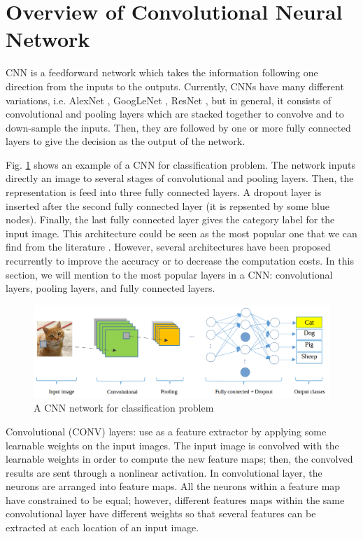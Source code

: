 \documentclass[review]{elsarticle}
\begin{document}
\section{Overview of Convolutional Neural Network}
\label{sOverview}
CNN is a feedforward network which takes the information following one direction from the inputs to the outputs. Currently, CNNs have many different variations, i.e. AlexNet \cite{krizhevsky2012imagenet}, GoogLeNet \cite{szegedy2014going}, ResNet \cite{he2016deep}, but in general, it consists of convolutional and pooling layers which are stacked together to convolve and to down-sample the inputs. Then, they are followed by one or more fully connected layers to give the decision as the output of the network. 

Fig. \ref{imgcnn_network} shows an example of a CNN for classification problem. The network inputs directly an image to several stages of convolutional and pooling layers. Then, the representation is feed into three fully connected layers. A dropout layer is inserted after the second fully connected layer (it is repsented by some blue nodes). Finally, the last fully connected layer gives the category label for the input image. This architecture could be seen as the most popular one that we can find from the literature \cite{lecun1998gradient, krizhevsky2012imagenet}. However, several architectures have been proposed recurrently to improve the accuracy or to decrease the computation costs. In this section, we will mention to the most popular layers in a CNN: convolutional layers, pooling layers, and fully connected layers.

\begin{figure}[!h]
	\centering
	\includegraphics[scale=.3]{images/cnn_network_2}
	\caption{A CNN network for classification problem}
	\label{imgcnn_network}
\end{figure}

Convolutional (CONV) layers: use as a feature extractor by applying some learnable weights on the input images. The input image is convolved with the learnable weights in order to compute the new feature maps; then, the convolved results are sent through a nonlinear activation. In convolutional layer, the neurons are arranged into feature maps. All the neurons within a feature map have constrained to be equal; however, different features maps within the same convolutional layer have different weights so that several features can be extracted at each location of an input image. 
\end{document}

